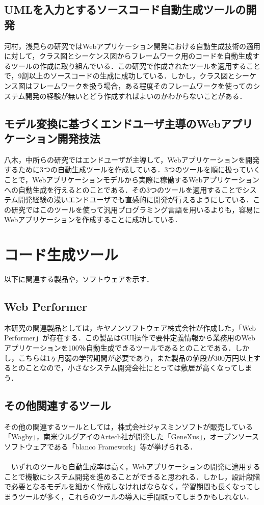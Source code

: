 \documentclass{funthesis}
\begin{document}
\subsection{UMLを入力とするソースコード自動生成ツールの開発}
河村，浅見らの研究\cite{blgen}ではWebアプリケーション開発における自動生成技術の適用に対して，クラス図とシーケンス図からフレームワーク用のコードを自動生成するツールの作成に取り組んでいる．この研究で作成されたツールを適用することで，9割以上のソースコードの生成に成功している．しかし，クラス図とシーケンス図はフレームワークを扱う場合，ある程度そのフレームワークを使ってのシステム開発の経験が無いとどう作成すればよいのかわからないことがある．

\subsection{モデル変換に基づくエンドユーザ主導のWebアプリケーション開発技法}
八木，中所らの研究\cite {endu}ではエンドユーザが主導して，Webアプリケーションを開発するために3つの自動生成ツールを作成している．3つのツールを順に扱っていくことで，Webアプリケーションモデルから実際に稼働するWebアプリケーションへの自動生成を行えるとのことである．その3つのツールを適用することでシステム開発経験の浅いエンドユーザでも直感的に開発が行えるようにしている．この研究ではこのツールを使って汎用プログラミング言語を用いるよりも，容易にWebアプリケーションを作成することに成功している．

\section{コード生成ツール}
以下に関連する製品や，ソフトウェアを示す．

\subsection{Web Performer}
本研究の関連製品としては，キヤノンソフトウェア株式会社が作成した，「Web Performer」\cite {webp}が存在する．この製品はGUI操作で要件定義情報から業務用のWebアプリケーションを100％自動生成できるツールであるとのことである．しかし，こちらは1ヶ月弱の学習期間が必要であり，また製品の値段が300万円以上するとのことなので，小さなシステム開発会社にとっては敷居が高くなってしまう．

\subsection{その他関連するツール}
その他の関連するツールとしては，株式会社ジャスミンソフトが販売している「Wagby」\cite {wagby}，南米ウルグアイのArtech社が開発した「GeneXus」\cite {gene}，オープンソースソフトウェアである「blanco Framework」\cite {blanco}等が挙げられる．\\\\
　いずれのツールも自動生成率は高く，Webアプリケーションの開発に適用することで機敏にシステム開発を進めることができると思われる．しかし，設計段階で必要となるモデルを細かく作成しなければならなく，学習期間も長くなってしまうツールが多く，これらのツールの導入に手間取ってしまうかもしれない．
\end{document}
